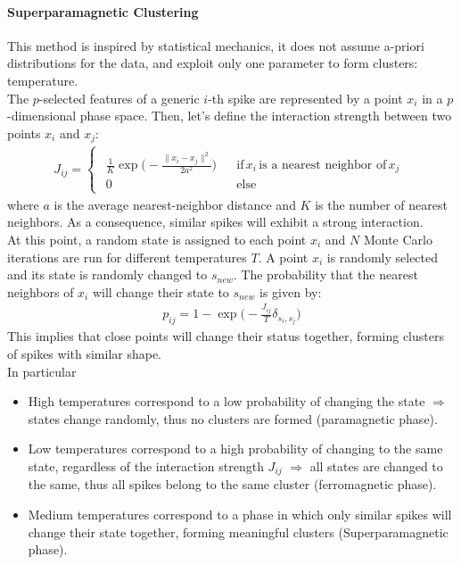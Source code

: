 \paragraph{Superparamagnetic Clustering}
This method is inspired by statistical mechanics, it does not assume
a-priori distributions for the data, and exploit only one parameter to
form clusters: temperature.\\
The \(p\)-selected features of a generic \(i\)-th spike are represented by a
point \(x_i\) in a \(p\)-dimensional phase space. Then, let's define the
interaction strength between two points \(x_i\) and \(x_j\):
\begin{align*}
    J_{ij}=
    \begin{cases}
        \begin{matrix}
            \frac{1}{K}\exp{\biggl(-\frac{\|x_i-x_j\|^2}{2a^2}\biggr)} && \text{if}\,x_i\,\text{is a nearest neighbor of}\,x_j \\
            0 && \text{else}
        \end{matrix}
    \end{cases}
\end{align*}
where \(a\) is the average nearest-neighbor distance and \(K\) is the
number of nearest neighbors.
As a consequence, similar spikes will exhibit a strong interaction.\\
At this point, a random state is assigned to each point \(x_i\) and \(N\) Monte
Carlo iterations are run for different temperatures \(T\). A point \(x_i\) is
randomly selected and its state is randomly changed to \(s_{new}\).
The probability that the nearest neighbors of \(x_i\) will change their state
to \(s_{new}\) is given by:
\begin{align*}
    p_{ij}=1-\exp{\biggl(-\frac{J_{ij}}{T}\delta_{s_i,s_j}\biggr)}
\end{align*}
This implies that close points will change their status together,
forming clusters of spikes with similar shape.\\
In particular
\begin{itemize}
    \item High temperatures correspond to a low probability of
    changing the state \(\Rightarrow\) states change randomly, thus no clusters
    are formed (paramagnetic phase).
    \item Low temperatures correspond to a high probability of changing to the
    same state, regardless of the interaction strength \(J_{ij}\)
    \(\Rightarrow\) all states are changed to the same, thus all spikes belong
    to the same cluster (ferromagnetic phase).
    \item Medium temperatures correspond to a phase in which only similar spikes
    will change their state together, forming meaningful clusters
    (Superparamagnetic phase).
\end{itemize}


